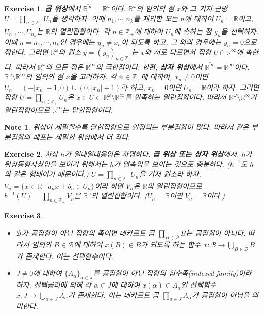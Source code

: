 \documentclass{article}
\newtheorem{exercise}{Exercise}[section]
\newtheorem*{note}{Note}
\newcommand{\R}{\mathbb{R}}
\newcommand{\Z}{\mathbb{Z}}
\begin{document}
\begin{exercise}
	\label{exc:19.7}
    \textbf{곱 위상}에서 $\overline{\R^\infty}=\R^\omega$이다. $\R^\omega$의 임의의 점 $x$와 그 기저 근방 $U=\prod_{n\in\Z_+}U_n$을 생각하자. 이때 $n_1,\cdots,n_k$를 제외한 모든 $n$에 대하여 $U_n=\R$이고, $U_{n_1},\cdots,U_{n_k}$는 $\R$의 열린집합이다. 각 $n\in\Z_+$에 대하여 $U_n$에 속하는 점 $y_n$을 선택하자. 이때 $n=n_1,\cdots,n_k$인 경우에는 $y_n\ne x_n$이 되도록 하고, 그 외의 경우에는 $y_n=0$으로 정한다. 그러면 $\R^\omega$의 원소 $y=(y_n)_{n\in\Z_+}$는 $x$와 서로 다르면서 집합 $U\cap\R^\infty$에 속한다. 따라서 $\R^\omega$의 모든 점은 $\R^\infty$의 극한점이다. 한편, \textbf{상자 위상}에서 $\overline{\R^\infty}=\R^\infty$이다. $\R^\omega\setminus\R^\infty$의 임의의 점 $x$을 고려하자. 각 $n\in\Z_+$에 대하여, $x_n\ne0$이면 $U_n=(-\vert x_n\vert-1,0)\cup(0,\vert x_n\vert+1)$라 하고, $x_n=0$이면 $U_n=\R$이라 하자. 그러면 집합 $U=\prod_{n\in\Z_+}U_n$은 $x\in U\subset\R^\omega\setminus\R^\infty$를 만족하는 열린집합이다. 따라서 $\R^\omega\setminus\R^\infty$가 열린집합이므로 $\R^\infty$는 닫힌집합이다.
\end{exercise}
\begin{note}
    위상이 세밀할수록 닫힌집합으로 인정되는 부분집합이 많다. 따라서 같은 부분집합의 폐포는 세밀한 위상에서 더 작다.
\end{note}

\begin{exercise}
	\label{exc:19.8}
    사상 $h$가 일대일대응임은 자명하다. \textbf{곱 위상 또는 상자 위상}에서, $h$가 위상동형사상임을 보이기 위해서는 $h$가 연속임을 보이는 것으로 충분하다. ($h^{-1}$도 $h$와 같은 형태이기 때문이다.) $U=\prod_{n\in\Z_-}U_n$을 기저 원소라 하자. $V_n=\{x\in\R\mid a_nx+b_n\in U_n\}$이라 하면 $V_n$은 $\R$의 열린집합이므로 $h^{-1}(U)=\prod_{n\in\Z_+}V_n$은 $\R^\omega$의 열린집합이다. ($U_n=\R$이면 $V_n=\R$이다.)
\end{exercise}

\begin{exercise}
    \phantom{}
    \begin{itemize}
        \item[($\Longleftarrow$)] $\mathcal B$가 공집합이 아닌 집합의 족이면 데카르트 곱 $\prod_{B\in\mathcal B}B$는 공집합이 아니다. 따라서 임의의 $B\in\mathcal B$에 대하여 $x(B)\in B$가 되도록 하는 함수 $x:\mathcal B\to\bigcup_{B\in\mathcal B}B$가 존재한다. 이는 선택함수이다.
        \item[($\Longrightarrow$)] $J\ne0$에 대하여 $\{A_\alpha\}_{\alpha\in J}$를 공집합이 아닌 집합의 첨수족(indexed family)이라 하자. 선택공리에 의해 각 $\alpha\in J$에 대하여 $x(\alpha)\in A_\alpha$인 선택함수 $x:J\to\bigcup_{\alpha\in J}A_\alpha$가 존재한다. 이는 데카르트 곱 $\prod_{\alpha\in J}A_\alpha$가 공집합이 아님을 의미한다.
    \end{itemize}
\end{exercise}
\end{document}
